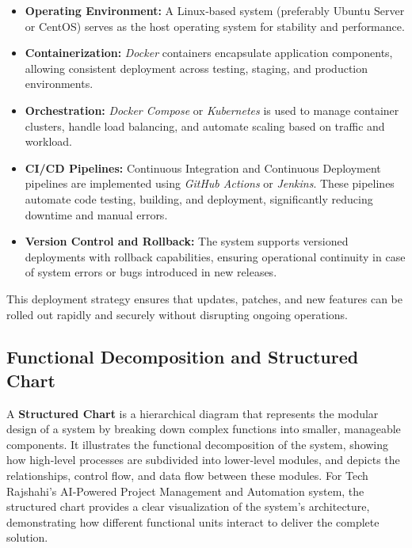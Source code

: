 \documentclass[12pt,a4paper]{article}
\begin{document}
\begin{itemize}
    \item \textbf{Operating Environment:} A Linux‑based system (preferably Ubuntu Server or CentOS) serves as the host operating system for stability and performance.
    
    \item \textbf{Containerization:} \textit{Docker} containers encapsulate application components, allowing consistent deployment across testing, staging, and production environments.
    
    \item \textbf{Orchestration:} \textit{Docker Compose} or \textit{Kubernetes} is used to manage container clusters, handle load balancing, and automate scaling based on traffic and workload.
    
    \item \textbf{CI/CD Pipelines:} Continuous Integration and Continuous Deployment pipelines are implemented using \textit{GitHub Actions} or \textit{Jenkins}.  These pipelines automate code testing, building, and deployment, significantly reducing downtime and manual errors.
    
    \item \textbf{Version Control and Rollback:} The system supports versioned deployments with rollback capabilities, ensuring operational continuity in case of system errors or bugs introduced in new releases.
\end{itemize}

This deployment strategy ensures that updates, patches, and new features can be rolled out rapidly and securely without disrupting ongoing operations.

\subsection{Functional Decomposition and Structured Chart}
A \textbf{Structured Chart} is a hierarchical diagram that represents the modular design of a system by breaking down complex functions into smaller, manageable components.  It illustrates the functional decomposition of the system, showing how high‑level processes are subdivided into lower‑level modules, and depicts the relationships, control flow, and data flow between these modules.  For Tech Rajshahi's AI‑Powered Project Management and Automation system, the structured chart provides a clear visualization of the system's architecture, demonstrating how different functional units interact to deliver the complete solution.
\end{document}
